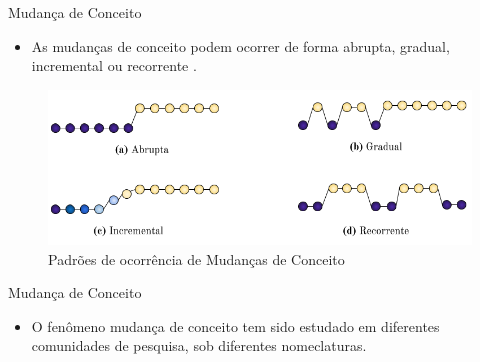 \documentclass[10pt]{beamer}
\begin{document}
\begin{frame}{Mudança de Conceito}
    \begin{itemize}
        \item<1 -> As mudanças de conceito podem ocorrer de forma \alert{abrupta}, \alert{gradual}, \alert{incremental} ou \alert{recorrente} \cite{Zliobaite:2010}.
    \end{itemize}
    \begin{figure}[H]
        \begin{center}
            \includegraphics[scale=0.5]{imagens/concept_drift_patterns.png}
            \caption{Padrões de ocorrência de Mudanças de Conceito}
            \label{fig:concept_drift_patterns}
        \end{center}
    \end{figure}
\end{frame}

\begin{frame}{Mudança de Conceito}
    \begin{itemize}
        \item<1 -> O fenômeno mudança de conceito tem sido estudado em diferentes comunidades de pesquisa, sob diferentes nomeclaturas.
    \end{itemize}
    \begin{table}[!ht]
        \centering
        \caption{Terminologia - Mudança de Conceito \cite{Zliobaite:2010}}
        \label{tbl:taxonomy}
    \end{table}
\end{frame}
\end{document}

